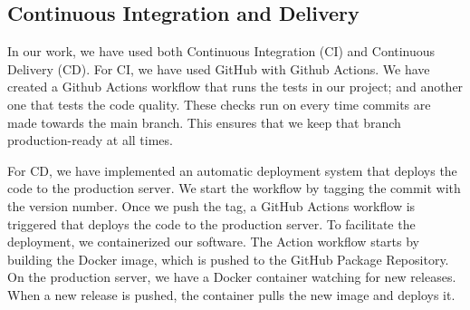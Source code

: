 \subsection{Continuous Integration and Delivery}
In our work, we have used both Continuous Integration (CI) and Continuous Delivery (CD).
For CI, we have used GitHub with Github Actions. We have created a Github Actions workflow that
runs the tests in our project; and another one that tests the code quality. These checks run
on every time commits are made towards the main branch. This ensures that we keep that branch production-ready
at all times.

For CD, we have implemented an automatic deployment system that deploys the code to the production server.
We start the workflow by tagging the commit with the version number. Once we push the tag, a GitHub Actions
workflow is triggered that deploys the code to the production server.
To facilitate the deployment, we containerized our software. The Action workflow starts by building the
Docker image, which is pushed to the GitHub Package Repository. On the production server, we have a Docker 
container watching for new releases. When a new release is pushed, the container pulls the new image and
deploys it.
